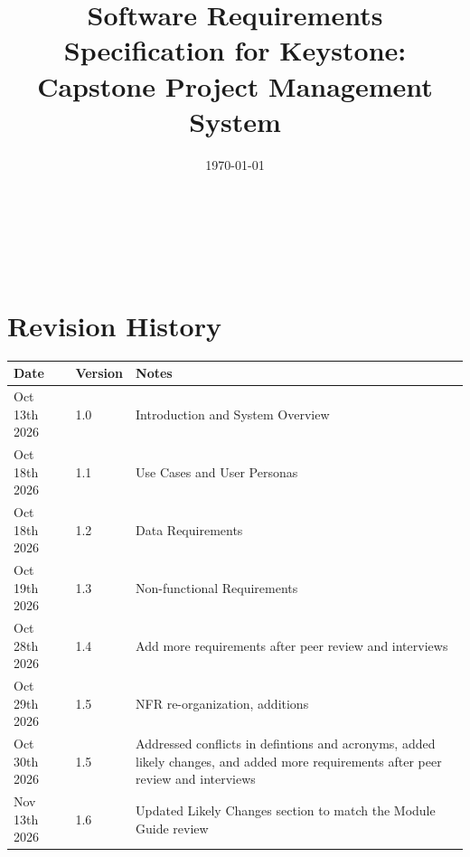 \documentclass[12pt]{article}
\begin{document}
  \title{Software Requirements Specification for Keystone: Capstone Project Management System}
  \author{\authname}
  \date{\today}

  \maketitle

  ~\newpage


  \tableofcontents

  \listoffigures
  \listoftables

  ~\newpage

  \section*{Revision History}

  \begin{tabularx}{\textwidth}{p{3cm}p{2cm}X}
\toprule {\bf Date} & {\bf Version} & {\bf Notes}\\
\midrule
Oct 13th 2026 & 1.0 & Introduction and System Overview\\
Oct 18th 2026 & 1.1 & Use Cases and User Personas\\
Oct 18th 2026 & 1.2 & Data Requirements\\
Oct 19th 2026 & 1.3 & Non-functional Requirements\\
Oct 28th 2026 & 1.4 & Add more requirements after peer review and interviews\\
Oct 29th 2026 & 1.5 & NFR re-organization, additions \\
Oct 30th 2026 & 1.5 & Addressed conflicts in defintions and acronyms, added likely changes, and added more requirements after peer review and interviews\\
Nov 13th 2026 & 1.6 & Updated Likely Changes section to match the Module Guide review\\
\bottomrule
  \end{tabularx}

  ~\\

  \newpage


\end{document}
